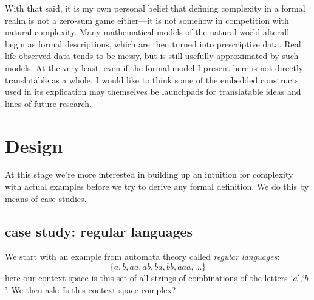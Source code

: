 \documentclass[twoside]{article}
\begin{document}
With that said, it is my own personal belief that defining complexity in a formal realm is not a zero-sum game either---it is
not somehow in competition with natural complexity. Many mathematical models of the natural world afterall begin as formal
descriptions, which are then turned into prescriptive data. Real life observed data tends to be messy, but is still usefully
approximated by such models. At the very least, even if the formal model I present here is not directly translatable as a whole,
I would like to think some of the embedded constructs used in its explication may themselves be launchpads for translatable ideas
and lines of future research.

\section*{Design}

At this stage we're more interested in building up an intuition for complexity with actual
examples before we try to derive any formal definition.  We do this by means of case studies.

\subsection*{case study: regular languages}

We start with an example from automata theory called \emph{regular languages}:
$$ \{a,b,aa,ab,ba,bb,aaa,\ldots\} $$
here our context space is this set of all strings of combinations of the letters `$ a $',`$ b $'.
We then ask: Is this context space complex?
\end{document}
